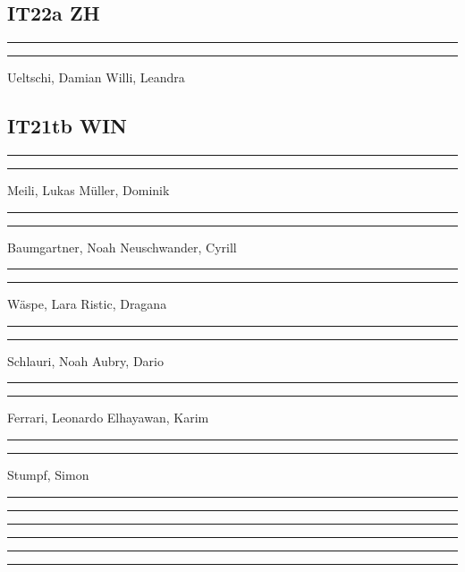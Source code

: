 \documentclass[fontsize=12pt,parskip=half]{scrartcl}
\begin{document}
\subsection*{IT22a ZH}
\vspace{50pt}
\noindent\rule{7cm}{.4pt}\hfill\rule{7cm}{.4pt}\par
\noindent Ueltschi, Damian \hfill Willi, Leandra

\subsection*{IT21tb WIN}
\vspace{50pt}
\noindent\rule{7cm}{.4pt}\hfill\rule{7cm}{.4pt}\par
\noindent Meili, Lukas \hfill Müller, Dominik

\vspace{50pt}
\noindent\rule{7cm}{.4pt}\hfill\rule{7cm}{.4pt}\par
\noindent Baumgartner, Noah \hfill Neuschwander, Cyrill

\vspace{50pt}
\noindent\rule{7cm}{.4pt}\hfill\rule{7cm}{.4pt}\par
\noindent Wäspe, Lara \hfill Ristic, Dragana

\vspace{50pt}
\noindent\rule{7cm}{.4pt}\hfill\rule{7cm}{.4pt}\par
\noindent Schlauri, Noah \hfill Aubry, Dario

\vspace{50pt}
\noindent\rule{7cm}{.4pt}\hfill\rule{7cm}{.4pt}\par
\noindent Ferrari, Leonardo \hfill Elhayawan, Karim

\vspace{50pt}
\noindent\rule{7cm}{.4pt}\hfill\rule{7cm}{.4pt}\par
\noindent Stumpf, Simon \hfill

\vspace{50pt}
\noindent\rule{7cm}{.4pt}\hfill\rule{7cm}{.4pt}\par
\noindent \hfill

\vspace{50pt}
\noindent\rule{7cm}{.4pt}\hfill\rule{7cm}{.4pt}\par
\noindent  \hfill

\vspace{50pt}
\noindent\rule{7cm}{.4pt}\hfill\rule{7cm}{.4pt}\par
\noindent  \hfill
\end{document}
